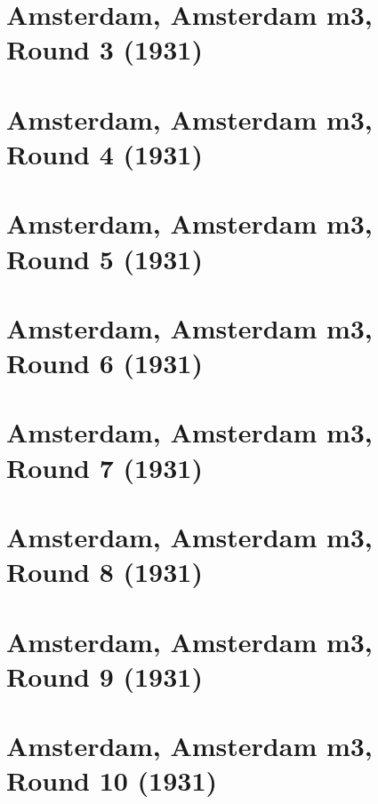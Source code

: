 \documentclass[11pt]{article}
\begin{document}
\section{Amsterdam, Amsterdam m3, Round 3 (1931)}


\clearpage

\section{Amsterdam, Amsterdam m3, Round 4 (1931)}


\clearpage

\section{Amsterdam, Amsterdam m3, Round 5 (1931)}


\clearpage

\section{Amsterdam, Amsterdam m3, Round 6 (1931)}


\clearpage

\section{Amsterdam, Amsterdam m3, Round 7 (1931)}


\clearpage

\section{Amsterdam, Amsterdam m3, Round 8 (1931)}


\clearpage

\section{Amsterdam, Amsterdam m3, Round 9 (1931)}


\clearpage

\section{Amsterdam, Amsterdam m3, Round 10 (1931)}


\clearpage
\end{document}
